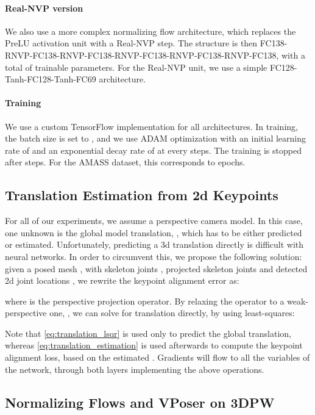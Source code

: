\documentclass[runningheads]{llncs}
\begin{document}
\paragraph{Real-NVP version} We also use a more complex normalizing flow architecture, which replaces the PreLU activation unit with a Real-NVP step. The structure is then FC138-RNVP-FC138-RNVP-FC138-RNVP-FC138-RNVP-FC138-RNVP-FC138, with a total of  trainable parameters. For the Real-NVP unit, we use a simple FC128-Tanh-FC128-Tanh-FC69 architecture. 

\paragraph{Training} We use a custom TensorFlow implementation for all architectures. In training, the batch size is set to , and we use  ADAM optimization with an initial learning rate of  and an exponential decay rate of  at every  steps. The training is stopped after  steps. For the AMASS dataset, this corresponds to  epochs.

\subsection{Translation Estimation from 2d Keypoints}

For all of our experiments, we assume a perspective camera model. In this case, one unknown is the global model translation, , which has to be either predicted or estimated.
Unfortunately, predicting a 3d translation directly is difficult with neural networks. In order to circumvent this, we propose the following solution: given a posed mesh , with skeleton joints , projected skeleton joints  and detected 2d joint locations , we rewrite the keypoint alignment error as:


where  is the perspective projection operator. By relaxing the operator to a weak-perspective one, , we can solve for  translation directly, by using least-squares:


Note that \eqref{eq:translation_lsqr} is used only to predict the global translation, whereas \eqref{eq:translation_estimation} is used afterwards to compute the keypoint alignment loss, based on the estimated . Gradients will flow to all the variables of the network, through both layers implementing the above operations.

\subsection{Normalizing Flows and VPoser on 3DPW}
\end{document}
